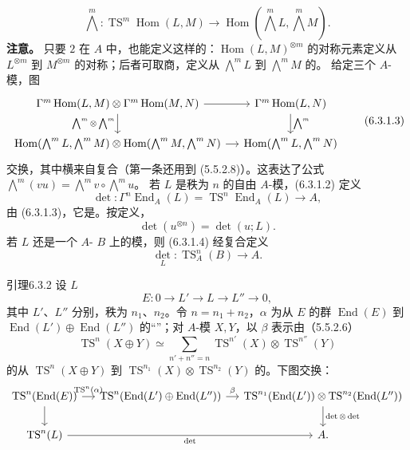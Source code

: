\[\bigwedge^m:\operatorname{TS}^m\operatorname{Hom}(L,M)\longrightarrow\operatorname{Hom}(\bigwedge^mL,\bigwedge^mM).\tag{6.3.1.2}\]
\textbf{注意。} 只要 $2$ 在 $A$ 中，也能定义这样的：$\operatorname{Hom}(L,M)^{\otimes m}$ 的对称元素定义从 $L^{\otimes m}$ 到 $M^{\otimes m}$ 的对称；后者可取商，定义从 $\bigwedge^mL$ 到 $\bigwedge^mM$ 的。
给定三个 $A$-模，图
\[\begin{tikzcd}[column sep=small]
\Gamma^m\operatorname{Hom}(L,M)\otimes\Gamma^m\operatorname{Hom}(M,N)\arrow[r]\arrow[d,"\bigwedge^m\otimes\bigwedge^m"']&\Gamma^m\operatorname{Hom}(L,N)\arrow[d,"\bigwedge^m"]\\
\operatorname{Hom}(\bigwedge^mL,\bigwedge^mM)\otimes\operatorname{Hom}(\bigwedge^mM,\bigwedge^mN)\arrow[r]&\operatorname{Hom}(\bigwedge^mL,\bigwedge^mN)
\end{tikzcd}\tag{6.3.1.3}\]
交换，其中横来自复合（第一条还用到 (5.5.2.8)）。这表达了公式 $\bigwedge^m(vu)=\bigwedge^m v\circ\bigwedge^m u$。
若 $L$ 是秩为 $n$ 的自由 $A$-模，(6.3.1.2) 定义
\[\det:\Gamma^n\operatorname{End}_A(L)=\operatorname{TS}^n\operatorname{End}_A(L)\longrightarrow A,\tag{6.3.1.4}\]
由 (6.3.1.3)，它是。按定义，
\[\det(u^{\otimes n})=\det(u;L).\tag{6.3.1.5}\]
若 $L$ 还是一个 $A$- $B$ 上的模，则 (6.3.1.4) 经复合定义
\[\det_L:\operatorname{TS}_A^n(B)\longrightarrow A.\tag{6.3.1.6}\]
\begin{SGAresult}{引理}{6.3.2}
设 $L$ 
\[E:0\longrightarrow L'\longrightarrow L\longrightarrow L''\longrightarrow0,\]
其中 $L'$、$L''$ 分别，秩为 $n_1$、$n_2$。令 $n=n_1+n_2$，$\alpha$ 为从 $E$ 的群 $\operatorname{End}(E)$ 到 $\operatorname{End}(L')\oplus\operatorname{End}(L'')$ 的“”；对 $A$-模 $X,Y$，以 $\beta$ 表示由（5.5.2.6）
\[\operatorname{TS}^n(X\oplus Y)\simeq\sum_{n'+n''=n}\operatorname{TS}^{n'}(X)\otimes\operatorname{TS}^{n''}(Y)\]
的从 $\operatorname{TS}^n(X\oplus Y)$ 到 $\operatorname{TS}^{n_1}(X)\otimes\operatorname{TS}^{n_2}(Y)$ 的。下图交换：
\[\begin{tikzcd}[column sep=small]
\operatorname{TS}^n(\operatorname{End}(E))\arrow[r,"\operatorname{TS}^n(\alpha)"]\arrow[d]&\operatorname{TS}^n(\operatorname{End}(L')\oplus\operatorname{End}(L''))\arrow[r,"\beta"]&\operatorname{TS}^{n_1}(\operatorname{End}(L'))\otimes\operatorname{TS}^{n_2}(\operatorname{End}(L''))\arrow[d,"\det\otimes\det"]\\
\operatorname{TS}^n(L)\arrow[rr,"\det"']&&A.
\end{tikzcd}\]
\end{SGAresult}
